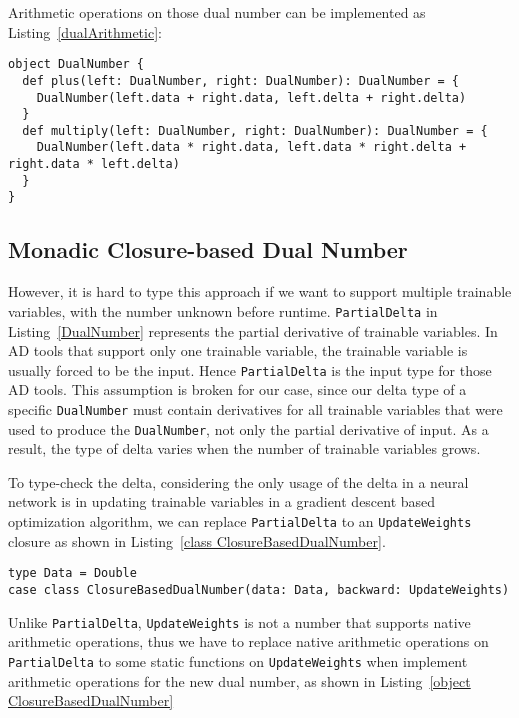 Arithmetic operations on those dual number can be implemented as Listing~\ref{dualArithmetic}:

\begin{lstlisting}[float={h t b p},caption={Arithmetic operations on dual number}, label={dualArithmetic}]
object DualNumber {
  def plus(left: DualNumber, right: DualNumber): DualNumber = {
    DualNumber(left.data + right.data, left.delta + right.delta)
  }
  def multiply(left: DualNumber, right: DualNumber): DualNumber = {
    DualNumber(left.data * right.data, left.data * right.delta + right.data * left.delta)
  }
}
\end{lstlisting}

\subsection{Monadic Closure-based Dual Number}
\label{monadic dual number}

However, it is hard to type this approach if we want to support multiple \glspl{trainable variable}, with the number unknown before runtime. \lstinline{PartialDelta} in Listing~\ref{DualNumber} represents the partial derivative of \glspl{trainable variable}. In AD tools that support only one \gls{trainable variable}, the \gls{trainable variable} is usually forced to be the input. Hence \lstinline{PartialDelta} is the input type for those AD tools. This assumption is broken for our case, since our delta type of a specific \lstinline{DualNumber} must contain derivatives for all \glspl{trainable variable} that were used to produce the \lstinline{DualNumber}, not only the partial derivative of input. As a result, the type of delta varies when the number of \glspl{trainable variable} grows.

To type-check the delta, considering the only usage of the delta in a neural network is in updating \glspl{trainable variable} in a gradient descent based optimization algorithm, we can replace \lstinline{PartialDelta} to an \lstinline{UpdateWeights} closure as shown in Listing~\ref{class ClosureBasedDualNumber}.

\begin{lstlisting}[float={h t b p},caption={Replacing \lstinline{PartialDelta} to a closure}, label={class ClosureBasedDualNumber}]
type Data = Double  
case class ClosureBasedDualNumber(data: Data, backward: UpdateWeights)
\end{lstlisting}

Unlike \lstinline{PartialDelta}, \lstinline{UpdateWeights} is not a number that supports native arithmetic operations, thus we have to replace native arithmetic operations on \lstinline{PartialDelta} to some static functions on \lstinline{UpdateWeights} when implement arithmetic operations for the new dual number, as shown in Listing~\ref{object ClosureBasedDualNumber}

